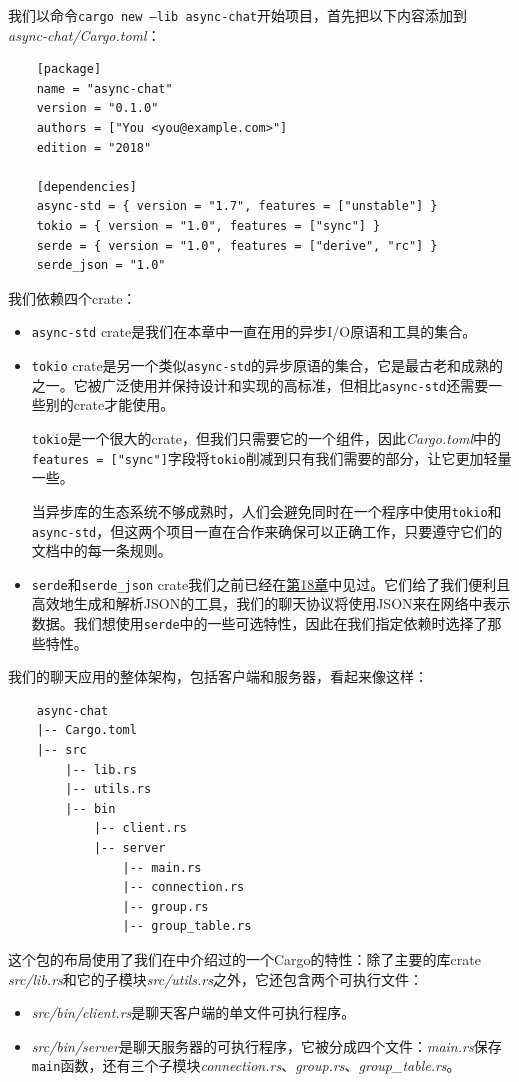 我们以命令\texttt{cargo new --lib async-chat}开始项目，首先把以下内容添加到\\
\emph{async-chat/Cargo.toml}：
\begin{verbatim}
    [package]
    name = "async-chat"
    version = "0.1.0"
    authors = ["You <you@example.com>"]
    edition = "2018"

    [dependencies]
    async-std = { version = "1.7", features = ["unstable"] }
    tokio = { version = "1.0", features = ["sync"] }
    serde = { version = "1.0", features = ["derive", "rc"] }
    serde_json = "1.0"
\end{verbatim}

我们依赖四个crate：
\begin{itemize}
    \item \texttt{async-std} crate是我们在本章中一直在用的异步I/O原语和工具的集合。
    \item \texttt{tokio} crate是另一个类似\texttt{async-std}的异步原语的集合，它是最古老和成熟的之一。它被广泛使用并保持设计和实现的高标准，但相比\texttt{async-std}还需要一些别的crate才能使用。
    
    \texttt{tokio}是一个很大的crate，但我们只需要它的一个组件，因此\emph{Cargo.toml}中的\texttt{features = ["sync"]}字段将\texttt{tokio}削减到只有我们需要的部分，让它更加轻量一些。

    当异步库的生态系统不够成熟时，人们会避免同时在一个程序中使用\texttt{tokio}和\texttt{async-std}，但这两个项目一直在合作来确保可以正确工作，只要遵守它们的文档中的每一条规则。
    \item \texttt{serde}和\texttt{serde\_json} crate我们之前已经在\hyperref[ch18]{第18章}中见过。它们给了我们便利且高效地生成和解析JSON的工具，我们的聊天协议将使用JSON来在网络中表示数据。我们想使用\texttt{serde}中的一些可选特性，因此在我们指定依赖时选择了那些特性。
\end{itemize}

我们的聊天应用的整体架构，包括客户端和服务器，看起来像这样：
\begin{verbatim}
    async-chat
    |-- Cargo.toml
    |-- src
        |-- lib.rs
        |-- utils.rs
        |-- bin
            |-- client.rs
            |-- server
                |-- main.rs
                |-- connection.rs
                |-- group.rs
                |-- group_table.rs
\end{verbatim}

这个包的布局使用了我们在中介绍过的一个Cargo的特性：除了主要的库crate \emph{src/lib.rs}和它的子模块\emph{src/utils.rs}之外，它还包含两个可执行文件：
\begin{itemize}
    \item \emph{src/bin/client.rs}是聊天客户端的单文件可执行程序。
    \item \emph{src/bin/server}是聊天服务器的可执行程序，它被分成四个文件：\emph{main.rs}保存\texttt{main}函数，还有三个子模块\emph{connection.rs}、\emph{group.rs}、\emph{group\_table.rs}。
\end{itemize}

